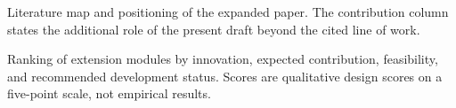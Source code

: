 \begin{table}[p]
\centering

\caption[Literature map]{Literature map and positioning of the expanded paper.
The contribution column states the additional role of the present draft beyond
the cited line of work.}
\label{tab:literature-map}
\end{table}

\begin{table}[p]
\centering

\caption[Extension ranking]{Ranking of extension modules by innovation,
expected contribution, feasibility, and recommended development status. Scores
are qualitative design scores on a five-point scale, not empirical results.}
\label{tab:extension-ranking}
\end{table}
